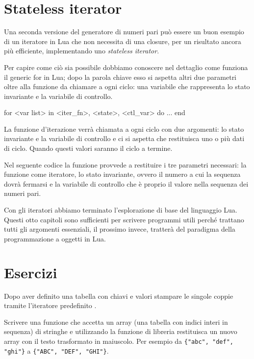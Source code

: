 \section{Stateless iterator}
\label{secFondStatelessIter}

Una seconda versione del generatore di numeri pari può essere un buon esempio
di un iteratore in Lua che non necessita di una closure, per un risultato ancora
più efficiente, implementando uno \emph{stateless iterator}.

Per capire come ciò sia possibile dobbiamo conoscere nel dettaglio come
funziona il generic for in Lua; dopo la parola chiave  esso si aspetta
altri due parametri oltre alla funzione da chiamare a ogni ciclo: una variabile
che rappresenta lo stato invariante e la variabile di controllo.
\begin{lines}
for <var list> in <iter_fn>, <state>, <ctl_var> do
    ...
end
\end{lines}

La funzione d'iterazione verrà chiamata a ogni ciclo con due argomenti: lo stato
invariante e la variabile di controllo e ci si aspetta che restituisca uno o più
dati di ciclo. Quando questi valori saranno  il ciclo a termine.

Nel seguente codice la funzione  provvede a restituire i tre
parametri necessari: la funzione  come iteratore, lo stato
invariante, ovvero il numero a cui la sequenza dovrà fermarsi e la variabile di
controllo che è proprio il valore nella sequenza dei numeri pari.

Con gli iteratori abbiamo terminato l'esplorazione di base del linguaggio Lua.
Questi otto capitoli sono sufficienti per scrivere programmi utili perché
trattano tutti gli argomenti essenziali, il prossimo invece, tratterà del
paradigma della programmazione a oggetti in Lua.


\section{Esercizi}

\begin{Exercise}[label=iter-01]
Dopo aver definito una tabella con chiavi e valori stampare le singole coppie
tramite l'iteratore predefinito .
\end{Exercise}

\begin{Exercise}[label=iter-02]
Scrivere una funzione che accetta un array (una tabella con indici interi in
sequenza) di stringhe e utilizzando la funzione di libreria 
restituisca un nuovo array con il testo trasformato in maiuscolo. Per esempio da
\verb|{"abc", "def", "ghi"}| a \verb|{"ABC", "DEF", "GHI"}|.
\end{Exercise}

